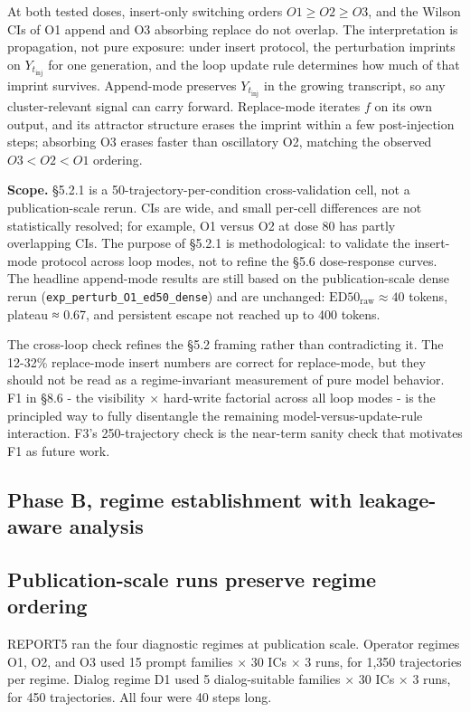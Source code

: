 \documentclass{article}
\theoremstyle{plain}
\theoremstyle{definition}
\begin{document}
At both tested doses, insert-only switching orders \(O1 \ge O2 \ge O3\), and the Wilson CIs of O1 append and O3 absorbing replace do not overlap. The interpretation is propagation, not pure exposure: under insert protocol, the perturbation imprints on \(Y_{t_{\mathrm{inj}}}\) for one generation, and the loop update rule determines how much of that imprint survives. Append-mode preserves \(Y_{t_{\mathrm{inj}}}\) in the growing transcript, so any cluster-relevant signal can carry forward. Replace-mode iterates \(f\) on its own output, and its attractor structure erases the imprint within a few post-injection steps; absorbing O3 erases faster than oscillatory O2, matching the observed \(O3 < O2 < O1\) ordering.

\textbf{Scope.} §5.2.1 is a 50-trajectory-per-condition cross-validation cell, not a publication-scale rerun. CIs are wide, and small per-cell differences are not statistically resolved; for example, O1 versus O2 at dose 80 has partly overlapping CIs. The purpose of §5.2.1 is methodological: to validate the insert-mode protocol across loop modes, not to refine the §5.6 dose-response curves. The headline append-mode results are still based on the publication-scale dense rerun (\texttt{exp\_perturb\_O1\_ed50\_dense}) and are unchanged: \(\mathrm{ED50}_{\mathrm{raw}}\approx 40\) tokens, plateau ≈ 0.67, and persistent escape not reached up to 400 tokens.

The cross-loop check refines the §5.2 framing rather than contradicting it. The 12-32\% replace-mode insert numbers are correct for replace-mode, but they should not be read as a regime-invariant measurement of pure model behavior. F1 in §8.6 - the visibility × hard-write factorial across all loop modes - is the principled way to fully disentangle the remaining model-versus-update-rule interaction. F3's 250-trajectory check is the near-term sanity check that motivates F1 as future work.


\subsection*{Phase B, regime establishment with leakage-aware analysis}

\subsection{Publication-scale runs preserve regime ordering}

REPORT5 ran the four diagnostic regimes at publication scale. Operator regimes O1, O2, and O3 used 15 prompt families × 30 ICs × 3 runs, for 1,350 trajectories per regime. Dialog regime D1 used 5 dialog-suitable families × 30 ICs × 3 runs, for 450 trajectories. All four were 40 steps long.
\end{document}
